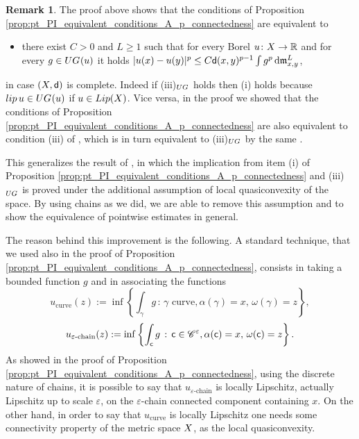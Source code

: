 \documentclass[12pt]{amsart}
\newcommand{\R}{\mathbb{R}}
\newcommand{\sfd}{{\sf d}}
\renewcommand{\d}{{\mathrm d}}
\newcommand{\X}{{\rm X}}
\newcommand{\lip}{{\rm lip}}
\newcommand{\Lip}{{\rm Lip}}
\newcommand{\mm}{\mathfrak m}
\theoremstyle{definition}
\newtheorem{remark}[theorem]{Remark}
\newcommand{\sfc}{{\sf c}}
\newcommand{\Chain}[1]{\mathscr{C}^{#1}}
\newcommand{\UG}[1]{{\rm UG}^{#1}}
\begin{document}
%
\begin{remark}
\label{rem:drop_quasiconvexity}
The proof above shows that the conditions of Proposition \ref{prop:pt_PI_equivalent_conditions_A_p_connectedness} are equivalent to
\begin{itemize}
    \item[(iii)$_\UG{}$] there exist $C >0$ and $L\ge 1$ such that for every Borel $u\colon \X \to \R$ and for every $g\in \UG{}(u)$ it holds $\vert u(x) - u(y) \vert ^p \le C\sfd(x,y)^{p-1}\int g^p \,\d\mm_{x,y}^L$,
\end{itemize}
in case $(\X,\sfd)$ is complete.
    Indeed if (iii)$_{\UG{}}$ holds then (i) holds because $\lip\,u \in \UG{}(u)$ if $u\in \Lip(\X)$. Vice versa, in the proof we showed that the conditions of Proposition \ref{prop:pt_PI_equivalent_conditions_A_p_connectedness} are also equivalent to condition (iii) of \cite[Theorem A.3]{CaputoCavallucci2024II}, which is in turn equivalent to (iii)$_{\UG{}}$ by the same \cite[Theorem A.3]{CaputoCavallucci2024II}.
    
    This generalizes the result of \cite[Theorem A.3]{CaputoCavallucci2024II}, in which the implication from item (i) of Proposition \ref{prop:pt_PI_equivalent_conditions_A_p_connectedness} and (iii)$_\UG{}$ is proved under the additional assumption of local quasiconvexity of the space. By using chains as we did, we are able to remove this assumption and to show the equivalence of pointwise estimates in general.

    The reason behind this improvement is the following. A standard technique, that we used also in the proof of Proposition \ref{prop:pt_PI_equivalent_conditions_A_p_connectedness}, consists in taking a bounded function $g$ and in associating the functions
    $$u_{\text{curve}}(z) := \inf\left\{ \int_\gamma g \,:\, \gamma \text{ curve}, \alpha(\gamma)=x,\,\omega(\gamma)=z \right\},$$
    $$u_{\varepsilon\text{-chain}}(z) := \inf\left\{ \int_\sfc g \,:\, \sfc\in \Chain{\varepsilon}, \alpha(\sfc)=x,\,\omega(\sfc)=z\right\}.$$
    As showed in the proof of Proposition \ref{prop:pt_PI_equivalent_conditions_A_p_connectedness}, using the discrete nature of chains, it is possible to say that $u_{\varepsilon\text{-chain}}$ is locally Lipschitz, actually Lipschitz up to scale $\varepsilon$, on the $\varepsilon$-chain connected component containing $x$. On the other hand, in order to say that $u_{\text{curve}}$ is locally Lipschitz one needs some connectivity property of the metric space $\X$, as the local quasiconvexity.
\end{remark}
\end{document}
